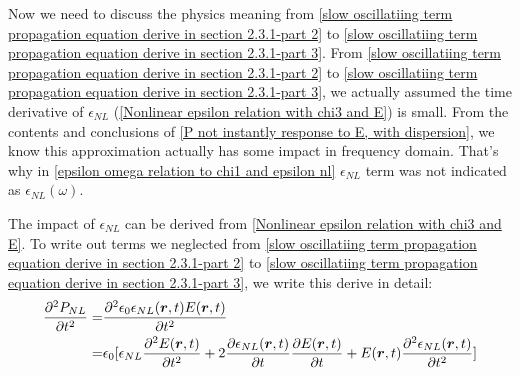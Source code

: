 \documentclass[12pt]{extarticle}
\numberwithin{equation}{section}
\numberwithin{figure}{section}
\numberwithin{table}{section}
\newcommand{\<}{\langle}
\renewcommand{\>}{\rangle}
\theoremstyle{definition}
\newcommand{\SubItem}[1]{
    {\setlength\itemindent{15pt} \item[-] #1}
}
\begin{document}
\begin{itemize}
                
                Now we need to discuss the physics meaning from \autoref{slow oscillatiing term propagation equation derive in section 2.3.1-part 2} to \autoref{slow oscillatiing term propagation equation derive in section 2.3.1-part 3}. From \autoref{slow oscillatiing term propagation equation derive in section 2.3.1-part 2} to \autoref{slow oscillatiing term propagation equation derive in section 2.3.1-part 3}, we actually assumed the time derivative of $\epsilon_{NL}$ (\autoref{Nonlinear epsilon relation with chi3 and E}) is small. From the contents and conclusions of \autoref{P not instantly response to E, with dispersion}, we know this approximation actually has some impact in frequency domain. That's why in \autoref{epsilon omega relation to chi1 and epsilon nl} $\epsilon_{NL}$ term was not indicated as $\epsilon_{NL}(\omega)$.
                    \SubItem{The impact of $\epsilon_{NL}$ can be derived from \autoref{Nonlinear epsilon relation with chi3 and E}. To write out terms we neglected from \autoref{slow oscillatiing term propagation equation derive in section 2.3.1-part 2} to \autoref{slow oscillatiing term propagation equation derive in section 2.3.1-part 3}, we write this derive in detail:
                        \begin{equation}
                        \begin{split}
                            \pdv[2]{P_{NL}}{t}=&\pdv[2]{\epsilon_0\epsilon_{NL}(\boldsymbol{r},t)E(\boldsymbol{r},t)}{t}\\
                            =&\epsilon_0[\epsilon_{NL}\pdv[2]{E(\boldsymbol{r},t)}{t}+2\pdv{\epsilon_{NL}(\boldsymbol{r},t)}{t}\pdv{E(\boldsymbol{r},t)}{t}+E(\boldsymbol{r},t)\pdv[2]{\epsilon_{NL}(\boldsymbol{r},t)}{t}]\\

\end{split}
\end{equation}}
\end{itemize}
\end{document}

